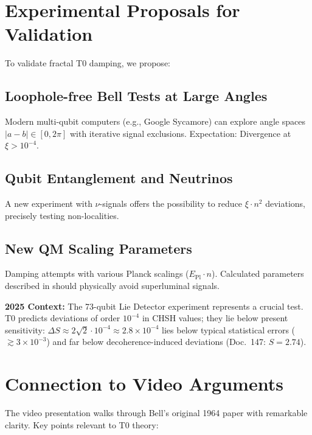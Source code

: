 \section{Experimental Proposals for Validation}
\label{sec:experiments}

To validate fractal T0 damping, we propose:

\subsection{Loophole-free Bell Tests at Large Angles}

Modern multi-qubit computers (e.g., Google Sycamore) can explore angle spaces $|a-b| \in [0, 2\pi]$ with iterative signal exclusions. Expectation: Divergence at $\xi > 10^{-4}$.

\subsection{Qubit Entanglement and Neutrinos}

A new experiment with $\nu$-signals offers the possibility to reduce $\xi \cdot n^2$ deviations, precisely testing non-localities.

\subsection{New QM Scaling Parameters}

Damping attempts with various Planck scalings ($E_{\text{Pl}} \cdot n$). Calculated parameters described in \cite{keysight2025} should physically avoid superluminal signals.

\textbf{2025 Context:} The 73-qubit Lie Detector experiment\cite{sciencedaily2025} represents a crucial test. T0 predicts deviations of order $10^{-4}$ in CHSH values; they lie below present sensitivity: $\Delta S \approx 2\sqrt{2} \cdot 10^{-4} \approx 2.8 \times 10^{-4}$ lies below typical statistical errors ($\gtrsim 3 \times 10^{-3}$) and far below decoherence-induced deviations (Doc.~147: $S = 2.74$).

\section{Connection to Video Arguments}
\label{sec:video_connection}

The video presentation\cite{youtube_bell2025} walks through Bell's original 1964 paper with remarkable clarity. Key points relevant to T0 theory:

